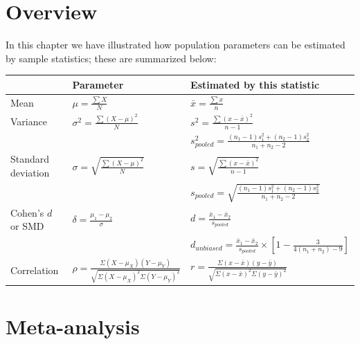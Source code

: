\documentclass[
]{krantz}
\begin{document}
\hypertarget{overview-1}{%
\section{Overview}\label{overview-1}}

In this chapter we have illustrated how population parameters can be estimated by sample statistics; these are summarized below:

\doublespacing

\begin{longtable}[]{@{}
  >{\raggedright\arraybackslash}p{}
  >{\raggedright\arraybackslash}p{}
  >{\raggedright\arraybackslash}p{}@{}}
\toprule
& Parameter & Estimated by this statistic \\
\midrule
\endhead
Mean & \(\mu = \frac{\sum{X}}{N}\) & \(\bar{x} = \frac{\sum{x}}{n}\) \\
Variance & \(\sigma^2 = \frac{\sum{(X - \mu)^2}}{N}\) & \(s^2 = \frac{\sum{(x - \bar{x})^2}}{n-1}\) \\
& & \(s_{pooled}^2 = \frac{(n_1 -1)s_1^2 + (n_2 -1)s_2^2}{n_1 + n_2-2}\) \\
Standard deviation & \(\sigma = \sqrt{\frac{\sum{(X - \mu)^2}}{N}}\) & \(s =\sqrt{\frac{\sum{(x - \bar{x})^2}}{n-1}}\) \\
& & \(s_{pooled} = \sqrt{\frac{(n_1 -1)s_1^2 + (n_2 -1)s_2^2}{n_1 + n_2-2}}\) \\
Cohen's \(d\) or SMD & \(\delta= \frac{\mu_{1} - \mu_{2}}{\sigma}\) & \(d = \frac{\bar{x}_{1} - \bar{x}_{2}}{s_{pooled}}\) \\
& & \(d_{unbiased} = \frac{\bar{x}_{1} - \bar{x}_{2}}{s_{pooled}} \times [1 - \frac{3}{4(n_1 + n_2)-9}]\) \\
Correlation & \(\rho = \frac{\Sigma (X - \mu_X)(Y - \mu_Y)}{\sqrt{\Sigma (X - \mu_X)^2\Sigma (Y - \mu_Y)^2}}\) & \(r = \frac{\Sigma (x - \bar{x})(y - \bar{y})}{\sqrt{\Sigma (x - \bar{x})^2\Sigma (y - \bar{y})^2}}\) \\
\bottomrule
\end{longtable}

\singlespacing

\hypertarget{meta-analysis}{%
\section{Meta-analysis}\label{meta-analysis}}
\end{document}
